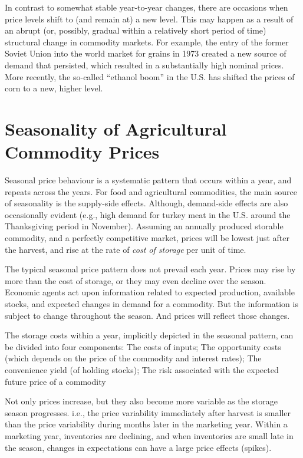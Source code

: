 \documentclass[
  oneside]{book}
\begin{document}
In contrast to somewhat stable year-to-year changes, there are occasions when price levels shift to (and remain at) a new level. This may happen as a result of an abrupt (or, possibly, gradual within a relatively short period of time) structural change in commodity markets. For example, the entry of the former Soviet Union into the world market for grains in 1973 created a new source of demand that persisted, which resulted in a substantially high nominal prices. More recently, the so-called ``ethanol boom'' in the U.S. has shifted the prices of corn to a new, higher level.

\hypertarget{seasonality-of-agricultural-commodity-prices}{%
\section{Seasonality of Agricultural Commodity Prices}\label{seasonality-of-agricultural-commodity-prices}}

Seasonal price behaviour is a systematic pattern that occurs within a year, and repeats across the years. For food and agricultural commodities, the main source of seasonality is the supply-side effects. Although, demand-side effects are also occasionally evident (e.g., high demand for turkey meat in the U.S. around the Thanksgiving period in November). Assuming an annually produced storable commodity, and a perfectly competitive market, prices will be lowest just after the harvest, and rise at the rate of \emph{cost of storage} per unit of time.

The typical seasonal price pattern does not prevail each year. Prices may rise by more than the cost of storage, or they may even decline over the season. Economic agents act upon information related to expected production, available stocks, and expected changes in demand for a commodity. But the information is subject to change throughout the season. And prices will reflect those changes.

The storage costs within a year, implicitly depicted in the seasonal pattern, can be divided into four components: The costs of inputs; The opportunity costs (which depends on the price of the commodity and interest rates); The convenience yield (of holding stocks); The risk associated with the expected future price of a commodity

Not only prices increase, but they also become more variable as the storage season progresses. i.e., the price variability immediately after harvest is smaller than the price variability during months later in the marketing year. Within a marketing year, inventories are declining, and when inventories are small late in the season, changes in expectations can have a large price effects (spikes).
\end{document}
